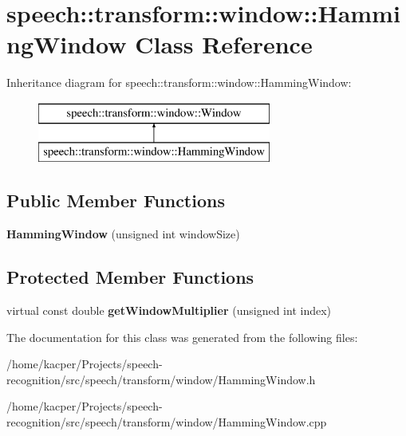 \hypertarget{classspeech_1_1transform_1_1window_1_1HammingWindow}{\section{speech\+:\+:transform\+:\+:window\+:\+:Hamming\+Window Class Reference}
\label{classspeech_1_1transform_1_1window_1_1HammingWindow}
}
Inheritance diagram for speech\+:\+:transform\+:\+:window\+:\+:Hamming\+Window\+:\begin{figure}[H]
\begin{center}
\leavevmode
\includegraphics[height=2.000000cm]{classspeech_1_1transform_1_1window_1_1HammingWindow}
\end{center}
\end{figure}
\subsection*{Public Member Functions}
\begin{DoxyCompactItemize}
\item 
\hypertarget{classspeech_1_1transform_1_1window_1_1HammingWindow_a26e68fa1914f62cdecb055e2b4a0f9a9}{{\bfseries Hamming\+Window} (unsigned int window\+Size)}\label{classspeech_1_1transform_1_1window_1_1HammingWindow_a26e68fa1914f62cdecb055e2b4a0f9a9}

\end{DoxyCompactItemize}
\subsection*{Protected Member Functions}
\begin{DoxyCompactItemize}
\item 
\hypertarget{classspeech_1_1transform_1_1window_1_1HammingWindow_a1e6e7a7c10032ec1edda6589da318586}{virtual const double {\bfseries get\+Window\+Multiplier} (unsigned int index)}\label{classspeech_1_1transform_1_1window_1_1HammingWindow_a1e6e7a7c10032ec1edda6589da318586}

\end{DoxyCompactItemize}


The documentation for this class was generated from the following files\+:\begin{DoxyCompactItemize}
\item 
/home/kacper/\+Projects/speech-\/recognition/src/speech/transform/window/Hamming\+Window.\+h\item 
/home/kacper/\+Projects/speech-\/recognition/src/speech/transform/window/Hamming\+Window.\+cpp\end{DoxyCompactItemize}
